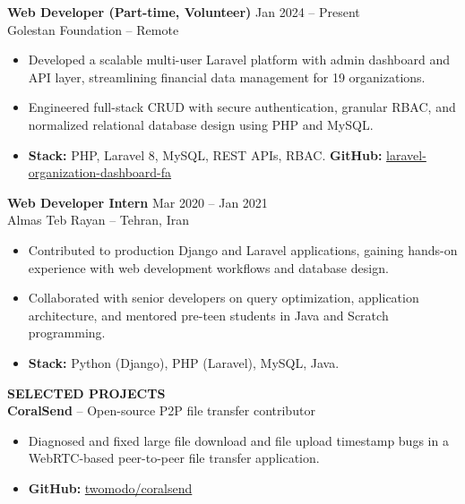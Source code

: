 \documentclass[10pt,letterpaper]{article}
\begin{document}
\textbf{Web Developer (Part-time, Volunteer)} \hfill Jan 2024 -- Present\\
Golestan Foundation -- Remote
\begin{itemize}
    \item Developed a scalable multi-user Laravel platform with admin dashboard and API layer, streamlining financial data management for 19 organizations.
    \item Engineered full-stack CRUD with secure authentication, granular RBAC, and normalized relational database design using PHP and MySQL.
    \item \textbf{Stack:} PHP, Laravel 8, MySQL, REST APIs, RBAC. \textbf{GitHub:} \href{https://github.com/parsasamandi/laravel-organization-dashboard-fa}{laravel-organization-dashboard-fa}
\end{itemize}

\vspace{4pt}

\textbf{Web Developer Intern} \hfill Mar 2020 -- Jan 2021\\
Almas Teb Rayan -- Tehran, Iran
\begin{itemize}
    \item Contributed to production Django and Laravel applications, gaining hands-on experience with web development workflows and database design.
    \item Collaborated with senior developers on query optimization, application architecture, and mentored pre-teen students in Java and Scratch programming.
    \item \textbf{Stack:} Python (Django), PHP (Laravel), MySQL, Java.
\end{itemize}

\vspace{5pt}

\textbf{SELECTED PROJECTS}\\[4pt]


\textbf{CoralSend} -- Open-source P2P file transfer contributor
\begin{itemize}
    \item Diagnosed and fixed large file download and file upload timestamp bugs in a WebRTC-based peer-to-peer file transfer application.
    \item \textbf{GitHub:} \href{https://github.com/twomodo/coralsend}{twomodo/coralsend}
\end{itemize}

\vspace{3pt}
\end{document}
